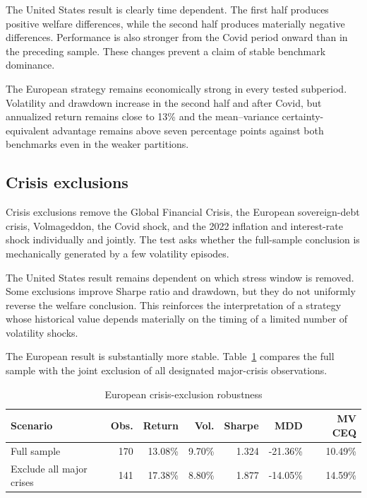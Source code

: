 The United States result is clearly time dependent. The first half produces positive welfare differences, while the second half produces materially negative differences. Performance is also stronger from the Covid period onward than in the preceding sample. These changes prevent a claim of stable benchmark dominance.

The European strategy remains economically strong in every tested subperiod. Volatility and drawdown increase in the second half and after Covid, but annualized return remains close to 13\% and the mean--variance certainty-equivalent advantage remains above seven percentage points against both benchmarks even in the weaker partitions.

\subsection{Crisis exclusions}

Crisis exclusions remove the Global Financial Crisis, the European sovereign-debt crisis, Volmageddon, the Covid shock, and the 2022 inflation and interest-rate shock individually and jointly. The test asks whether the full-sample conclusion is mechanically generated by a few volatility episodes.

The United States result remains dependent on which stress window is removed. Some exclusions improve Sharpe ratio and drawdown, but they do not uniformly reverse the welfare conclusion. This reinforces the interpretation of a strategy whose historical value depends materially on the timing of a limited number of volatility shocks.

The European result is substantially more stable. Table~\ref{tab:crisis_robustness} compares the full sample with the joint exclusion of all designated major-crisis observations.

\begin{table}[htbp]
\centering
\small
\caption{European crisis-exclusion robustness}
\label{tab:crisis_robustness}
\begin{tabularx}{\textwidth}{Xrrrrrr}
\toprule
Scenario
& Obs.
& Return
& Vol.
& Sharpe
& MDD
& MV CEQ \\
\midrule
Full sample
& 170
& 13.08\%
& 9.70\%
& 1.324
& -21.36\%
& 10.49\% \\
Exclude all major crises
& 141
& 17.38\%
& 8.80\%
& 1.877
& -14.05\%
& 14.59\% \\
\bottomrule
\end{tabularx}
\end{table}

